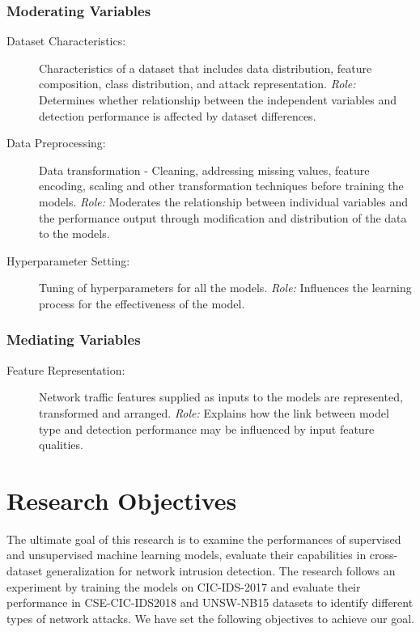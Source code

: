 \subsubsection{Moderating Variables}
\begin{description}
    \item[Dataset Characteristics:] Characteristics of a dataset that includes data distribution, feature composition, class distribution,  and attack representation.
    \textit{Role:} Determines whether relationship between the independent variables and detection performance is affected by dataset differences.
    \item[Data Preprocessing:] Data transformation - Cleaning, addressing missing values, feature encoding, scaling and other transformation techniques before training the models.
    \textit{Role:} Moderates the relationship between individual variables and the performance output through modification and distribution of the data to the models. 
    \item[Hyperparameter Setting:] Tuning of hyperparameters for all the models.
    \textit{Role:} Influences the learning process for the effectiveness of the model.
    \end{description}

\subsubsection{Mediating Variables}
\begin{description}
    \item[Feature Representation:] Network traffic features supplied as inputs to the models are represented, transformed and arranged.
    \textit{Role:} Explains how the link between model type and detection performance may be influenced by input feature qualities.
    \end{description}

 \section{Research Objectives}
The ultimate goal of this research is to examine the performances of supervised and unsupervised machine learning models, evaluate their capabilities in 
cross-dataset generalization for network intrusion detection. The research follows an experiment by training the models on CIC-IDS-2017 and evaluate their 
performance in CSE-CIC-IDS2018 and UNSW-NB15 datasets to identify different types of network attacks. We have set the following objectives to achieve our goal.

